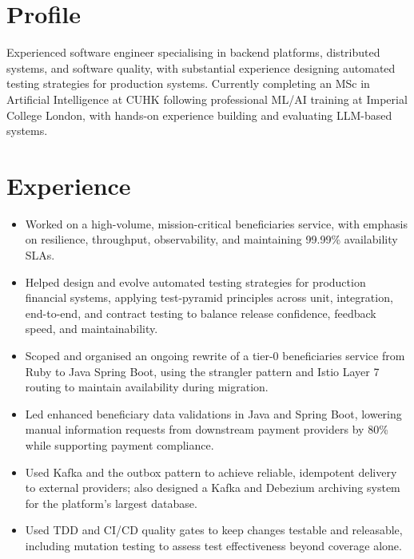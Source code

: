 \documentclass[11pt,letterpaper]{article}
\begin{document}
\cvheader

\section*{Profile}
Experienced software engineer specialising in backend platforms, distributed systems, and software quality, with substantial experience designing automated testing strategies for production systems. Currently completing an MSc in Artificial Intelligence at CUHK following professional ML/AI training at Imperial College London, with hands-on experience building and evaluating LLM-based systems.

\section*{Experience}
\begin{itemize}
  \item Worked on a high-volume, mission-critical beneficiaries service, with emphasis on resilience, throughput, observability, and maintaining 99.99\% availability SLAs.
  \item Helped design and evolve automated testing strategies for production financial systems, applying test-pyramid principles across unit, integration, end-to-end, and contract testing to balance release confidence, feedback speed, and maintainability.
  \item Scoped and organised an ongoing rewrite of a tier-0 beneficiaries service from Ruby to Java Spring Boot, using the strangler pattern and Istio Layer 7 routing to maintain availability during migration.
  \item Led enhanced beneficiary data validations in Java and Spring Boot, lowering manual information requests from downstream payment providers by 80\% while supporting payment compliance.
  \item Used Kafka and the outbox pattern to achieve reliable, idempotent delivery to external providers; also designed a Kafka and Debezium archiving system for the platform's largest database.
  \item Used TDD and CI/CD quality gates to keep changes testable and releasable, including mutation testing to assess test effectiveness beyond coverage alone.
\end{itemize}
\end{document}

